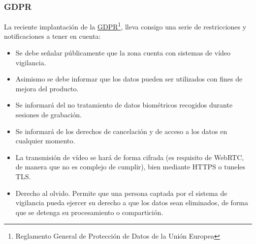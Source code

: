 \subsubsection{GDPR}
La reciente implantación de la \href{https://www.eugdpr.org/key-changes.html}{GDPR}\footnote{Reglamento General de Protección de Datos de la Unión Europea}, lleva consigo una serie de restricciones y notificaciones a tener en cuenta: 
\begin{itemize}
\item Se debe señalar públicamente que la zona cuenta con sistemas de vídeo vigilancia.
\item Asimismo se debe informar que los datos pueden ser utilizados con fines de mejora del producto.
\item Se informará del no tratamiento de datos biométricos recogidos durante sesiones de grabación.
\item Se informará de los derechos de cancelación y de acceso a los datos en cualquier momento.
\item La transmisión de vídeo se hará de forma cifrada (es requisito de WebRTC, de manera que no es complejo de cumplir), bien mediante HTTPS o tuneles TLS. 
\item Derecho al olvido. Permite que una persona captada por el sistema de vigilancia pueda ejercer su derecho a que los datos sean eliminados, de forma que se detenga su procesamiento o compartición. 
\end{itemize}




